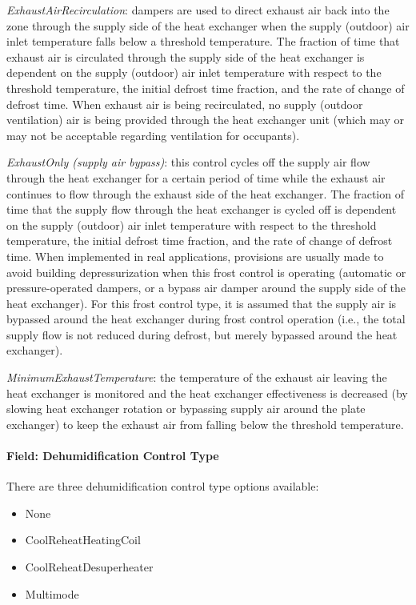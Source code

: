 \emph{ExhaustAirRecirculation}: dampers are used to direct exhaust air back into the zone through the supply side of the heat exchanger when the supply (outdoor) air inlet temperature falls below a threshold temperature. The fraction of time that exhaust air is circulated through the supply side of the heat exchanger is dependent on the supply (outdoor) air inlet temperature with respect to the threshold temperature, the initial defrost time fraction, and the rate of change of defrost time. When exhaust air is being recirculated, no supply (outdoor ventilation) air is being provided through the heat exchanger unit (which may or may not be acceptable regarding ventilation for occupants).

\emph{ExhaustOnly (supply air bypass)}: this control cycles off the supply air flow through the heat exchanger for a certain period of time while the exhaust air continues to flow through the exhaust side of the heat exchanger. The fraction of time that the supply flow through the heat exchanger is cycled off is dependent on the supply (outdoor) air inlet temperature with respect to the threshold temperature, the initial defrost time fraction, and the rate of change of defrost time. When implemented in real applications, provisions are usually made to avoid building depressurization when this frost control is operating (automatic or pressure-operated dampers, or a bypass air damper around the supply side of the heat exchanger). For this frost control type, it is assumed that the supply air is bypassed around the heat exchanger during frost control operation (i.e., the total supply flow is not reduced during defrost, but merely bypassed around the heat exchanger).

\emph{MinimumExhaustTemperature}: the temperature of the exhaust air leaving the heat exchanger is monitored and the heat exchanger effectiveness is decreased (by slowing heat exchanger rotation or bypassing supply air around the plate exchanger) to keep the exhaust air from falling below the threshold temperature.

\paragraph{Field: Dehumidification Control Type}\label{field-dehumidification-control-type-7}

There are three dehumidification control type options available:

\begin{itemize}
\item
  None
\item
  CoolReheatHeatingCoil
\item
  CoolReheatDesuperheater
\item
  Multimode
\end{itemize}


